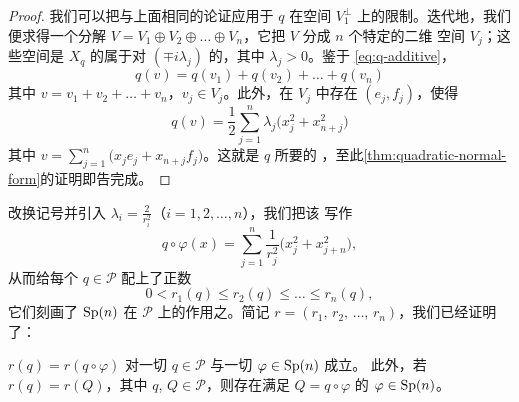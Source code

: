 \begin{proof}
我们可以把与上面相同的论证应用于 $q$ 在\trSymplectic{}空间 $V_1^{\perp}$%
上的限制。迭代地，我们便求得一个分解%
$V=V_1\oplus V_2\oplus\dots\oplus V_n$，它把 $V$ 分成 $n$ 个特定的二维%
\trSymplectic{}空间 $V_j$；这些空间是 $X_q$ 的属于\trEigenvalue{}对%
$(\mp i\lambda_j)$ 的\trEigenspace，其中 $\lambda_j>0$。鉴于%
\eqref{eq:q-additive}，
\[
q(v)=q(v_1)+q(v_2)+\dots+q(v_n)
\]
其中 $v=v_1+v_2+\dots+v_n$，$v_j\in V_j$。此外，在 $V_j$ 中存在%
\trSymplecticBasis{} $(e_j,f_j)$，使得
\[
q(v)=\frac{1}{2}\sum_{j=1}^{n}\lambda_j\bigl(x_j^{2}+x_{n+j}^{2}\bigr)
\]
其中 $v=\sum_{j=1}^{n}\bigl(x_j e_j+x_{n+j}f_j\bigr)$。这就是 $q$ 所要的%
\trNormalForm，至此\cref{thm:quadratic-normal-form}的证明即告完成。
\end{proof}

改换记号并引入 $\lambda_i=\tfrac{2}{r_i^{2}}$（$i=1,2,\dots,n$），我们把该%
\trNormalForm{}写作
\[
q\circ\varphi(x)=\sum_{j=1}^{n}\frac{1}{r_j^{2}}\bigl(x_j^{2}+x_{j+n}^{2}\bigr),
\]
从而给每个 $q\in\mathcal{P}$ 配上了正数
\[
0<r_1(q)\leq r_2(q)\leq\dots\leq r_n(q),
\]
它们刻画了 $\operatorname{Sp}(n)$ 在 $\mathcal{P}$ 上的作用之\trOrbit。简记%
$r=(r_1,\,r_2,\,\dots,\,r_n)$，我们已经证明了：

\begin{proposition}\label{prop:r-composition-invariant}
$r(q)=r(q\circ\varphi)$ 对一切 $q\in\mathcal{P}$ 与一切 $\varphi\in\operatorname{Sp}(n)$ 成立。%
此外，若 $r(q)=r(Q)$，其中 $q$, $Q\in\mathcal{P}$，则存在满足 $Q=q\circ\varphi$%
的 $\varphi\in\operatorname{Sp}(n)$。
\end{proposition}


